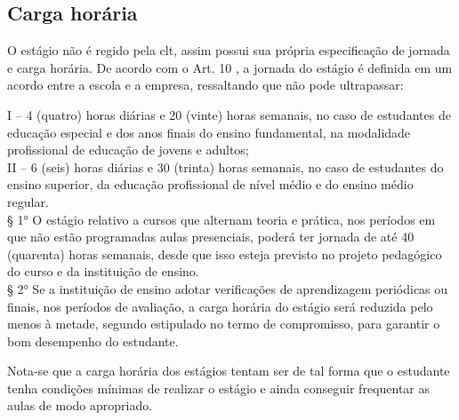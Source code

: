 \subsection{Carga horária}
O estágio não é regido pela \ac{clt}, assim possui sua própria especificação de jornada e carga horária. De acordo com o Art. 10 \cite{leiestagio}, a jornada do estágio é definida em um acordo entre a escola e a empresa, ressaltando que não pode ultrapassar:
\begin{quoting}[rightmargin=0cm,leftmargin=4cm]
	\begin{SingleSpace}
	{\footnotesize
	I – 4 (quatro) horas diárias e 20 (vinte) horas semanais, no caso de estudantes de educação especial e dos anos finais do ensino fundamental, na modalidade profissional de educação de jovens e adultos;\\II – 6 (seis) horas diárias e 30 (trinta) horas semanais, no caso de estudantes do ensino superior, da educação profissional de nível médio e do ensino médio regular.\\§ 1°  O estágio relativo a cursos que alternam teoria e prática, nos períodos em que não estão programadas aulas presenciais, poderá ter jornada de até 40 (quarenta) horas semanais, desde que isso esteja previsto no projeto pedagógico do curso e da instituição de ensino. \\§ 2°  Se a instituição de ensino adotar verificações de aprendizagem periódicas ou finais, nos períodos de avaliação, a carga horária do estágio será reduzida pelo menos à metade, segundo estipulado no termo de compromisso, para garantir o bom desempenho do estudante.\cite{leiestagio}
	}
	\end{SingleSpace}
\end{quoting}

Nota-se que a carga horária dos estágios tentam ser de tal forma que o estudante tenha condições mínimas de realizar o estágio e ainda conseguir frequentar as aulas de modo apropriado.
